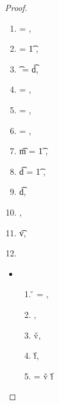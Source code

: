 \begin{lemma}
\begin{proof}
\begin{case}[T-DefMethod]
        \begin{enumerate}
          \item
  \e{} = { {} {}},
          \item
   = {\abs {\x{}} {\t{1}} {}},
          \item
  \t{} = { {\t{d}}},
          \item
  \thenprop{\prop{}} = {\topprop{}},
          \item
  \elseprop{\prop{}} = {\botprop{}},
          \item
  \object{} = {\emptyobject{}},
          \item
  \t{m} = {\ArrowOne {\x{}} {\t{1}} {\s{}}
                     {
                                 {}}
                     {}},
          \item
  \t{d} = {\ArrowOne {\x{}} {\t{1}} {\sp{}}
                     {
                                 {}}
                     {}},
          \item
  \judgementtwo {\propenv{}} { { {\t{d}}}},
          \item
  ,
          \item
  \judgementtwo {\propenv{}}
               { {\t{v}}},
          \item
           { {\s{}}}
           {
                       {}}
           {}
        \end{enumerate}

  \begin{itemize}
    \item[]
      \begin{subcase}[B-DefMethod]
        \ 
        
        \begin{enumerate}[resume]
          \item
       \v{} = { {\disptablep{}}},
          \item
        \opsem {\openv{}}
               {}
               { {\disptable{}}},
          \item
  \opsem {\openv{}}
         {}
         {\v{v}},
          \item
  \opsem {\openv{}}
         {}
         {\v{f}},
          \item
         \disptablep{} = {\extenddisptable {\disptable{}} 
                                {\v{v}}
                                {\v{f}}}
        \end{enumerate}


\end{subcase}
\end{itemize}
\end{case}
\end{proof}
\end{lemma}
